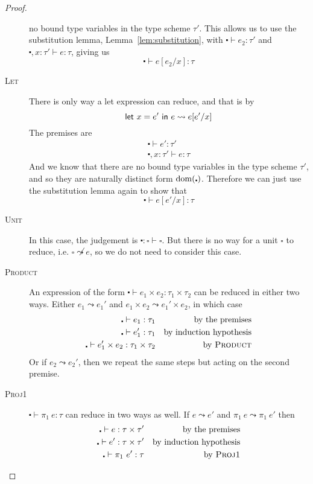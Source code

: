 \begin{proof}
\begin{description}
    no bound type variables in the type scheme $\tau'$.  This allows us
    to use the substitution lemma, Lemma~\ref{lem:substitution}, with $\centerdot \vdash e_2 : \tau'$ and
    $\centerdot , x : \tau' \vdash e : \tau$, giving us
    \[ \centerdot \vdash e [ e_2 / x ] : \tau \]
  \item[\rm\textsc{Let}] There is only way a let expression can
    reduce, and that is by
    \[\mathsf{let} \ x = e' \ \mathsf{in} \ e \leadsto e [e' / x]\]
    The premises are
    \begin{align*}
      \centerdot \vdash e' : \tau' \\
      \centerdot , x : \tau' \vdash e : \tau
    \end{align*}
    And we know that there are no bound type variables in the type
    scheme $\tau'$, and so they are naturally distinct form
    $\operatorname{dom}(\centerdot)$. Therefore we can just use the substitution lemma again
    to show that
    \[ \centerdot \vdash e [e' / x] : \tau \]
  \item[\rm\textsc{Unit}] In this case, the judgement is
    $\centerdot : \square \vdash \square$. But there is no way for a unit
    $\square$ to reduce, i.e. $\square \not\leadsto e$, so we do not need to consider this case.
  \item[\rm\textsc{Product}] An expression of the form
    $\centerdot \vdash e_1 \times e_2: \tau_1 \times \tau_2$ can be reduced in either two
    ways. Either $e_1 \leadsto e_1'$ and
    $e_1 \times e_2 \leadsto e_1' \times e_2$, in which case
    \begin{align*}
      \centerdot \vdash e_1 : \tau_1 && \text{by the premises} \\
      \centerdot \vdash e_1' : \tau_1 && \text{by induction hypothesis} \\
      \centerdot \vdash e_1' \times e_2 : \tau_1 \times \tau_2 && \text{by \textsc{Product}}
    \end{align*}
    Or if $e_2 \leadsto e_2'$, then we repeat the same steps but acting on
    the second premise.
  \item[\rm\textsc{Proj1}] $\centerdot \vdash \pi_1 \ e : \tau$ can reduce in two ways as
    well. If $e \leadsto e'$ and $\pi_1 \ e \leadsto \pi_1 \ e'$ then
    \begin{align*}
      \centerdot \vdash e : \tau \times \tau' && \text{by the premises} \\
      \centerdot \vdash e' : \tau \times \tau' && \text{by induction hypothesis} \\
      \centerdot \vdash \pi_1 \ e' : \tau && \text{by \textsc{Proj1}}

\end{align*}
\end{description}
\end{proof}
